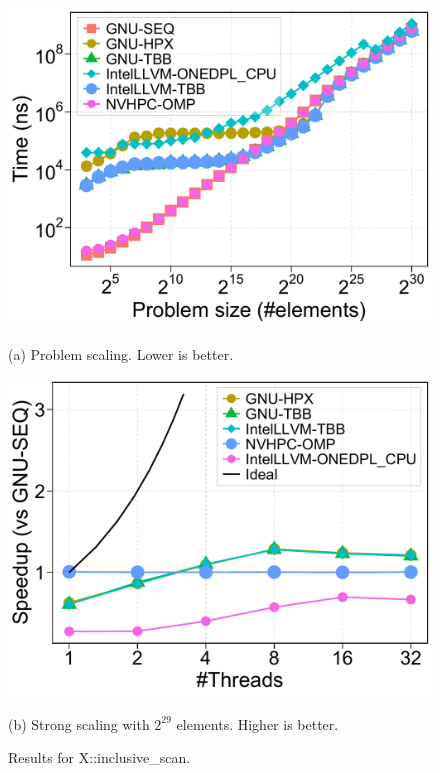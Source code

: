 \documentclass[sigconf]{acmart}
\begin{document}
\begin{figure}[H]
      \centering
      \begin{minipage}[t]{0.48\linewidth}
            \centering
            \includegraphics[width=\linewidth]{figures/problemSize_time-inclusive_scan}
            \caption*{(a) Problem scaling. Lower is better.}
      \end{minipage}
      \hfill
      \begin{minipage}[t]{0.48\linewidth}
            \centering
            \includegraphics[width=\linewidth]{figures/speedup_threads-inclusive_scan}
            \caption*{(b) Strong scaling with $2^{29}$ elements. Higher is better.}
      \end{minipage}
      \caption{Results for X::inclusive\_scan.}\label{fig:x::inclusive_scan}
\end{figure}
\end{document}
